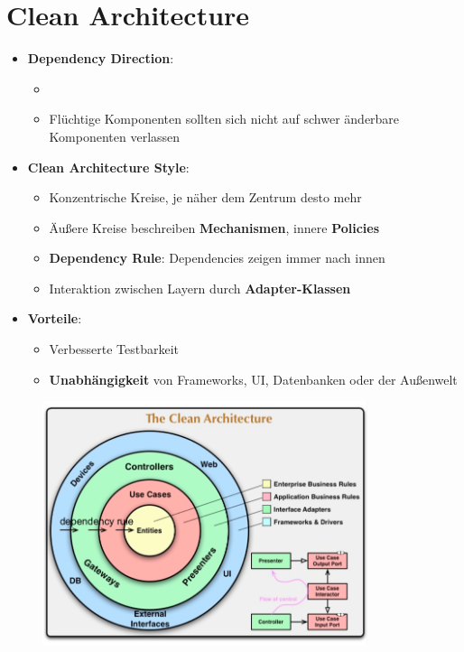 \section{Clean Architecture}
\label{ca:sec:clean_architecture}

\begin{itemize}
	\item \textbf{Dependency Direction}:
	\begin{itemize}
		\item {}
		\item Flüchtige Komponenten sollten sich nicht auf schwer änderbare Komponenten verlassen
	\end{itemize}
	\item \textbf{Clean Architecture Style}:
	\begin{itemize}
		\item Konzentrische Kreise, je näher dem Zentrum desto mehr 
		\item Äußere Kreise beschreiben \textbf{Mechanismen}, innere \textbf{Policies}
		\item \textbf{Dependency Rule}: Dependencies zeigen immer nach innen
		\item Interaktion zwischen Layern durch \textbf{Adapter-Klassen}
	\end{itemize}
	\item \textbf{Vorteile}:
	\begin{itemize}
		\item Verbesserte Testbarkeit
		\item \textbf{Unabhängigkeit} von Frameworks, UI, Datenbanken oder der Außenwelt
	\end{itemize}
\end{itemize}

\begin{figure}[!h]
	\centering
	\includegraphics[width=0.85\textwidth]{images/clean_architecture.png}
\end{figure}